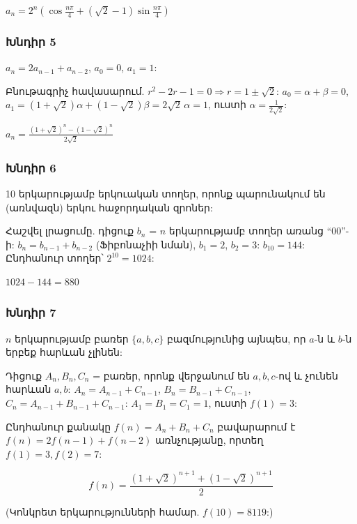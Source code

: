 $\boxed{a_n = 2^n\!\left(\cos\frac{n\pi}{4} + (\sqrt{2}-1)\sin\frac{n\pi}{4}\right)}$

\subsubsection*{Խնդիր 5}
$a_n=2a_{n-1}+a_{n-2}$, $a_0=0$, $a_1=1$:

Բնութագրիչ հավասարում. $r^2-2r-1=0 \Rightarrow r=1\pm\sqrt{2}$:
$a_0=\alpha+\beta=0$, $a_1=(1+\sqrt{2})\alpha+(1-\sqrt{2})\beta = 2\sqrt{2}\,\alpha=1$, ուստի $\alpha=\frac{1}{2\sqrt{2}}$:

$\boxed{a_n = \frac{(1+\sqrt{2})^n - (1-\sqrt{2})^n}{2\sqrt{2}}}$

\subsubsection*{Խնդիր 6}
10 երկարությամբ երկուական տողեր, որոնք պարունակում են (առնվազն) երկու հաջորդական զրոներ:

Հաշվել լրացումը. դիցուք $b_n$ = $n$ երկարությամբ տողեր առանց ``00''-ի:
$b_n = b_{n-1}+b_{n-2}$ (Ֆիբոնաչիի նման), $b_1=2$, $b_2=3$:
$b_{10}=144$: Ընդհանուր տողեր՝ $2^{10}=1024$:

$\boxed{1024-144=880}$

\subsubsection*{Խնդիր 7}
$n$ երկարությամբ բառեր $\{a,b,c\}$ բազմությունից այնպես, որ $a$-ն և $b$-ն երբեք հարևան չլինեն:

Դիցուք $A_n, B_n, C_n$ = բառեր, որոնք վերջանում են $a, b, c$-ով և չունեն հարևան $a,b$:
$A_n = A_{n-1}+C_{n-1}$, $B_n = B_{n-1}+C_{n-1}$, $C_n = A_{n-1}+B_{n-1}+C_{n-1}$:
$A_1=B_1=C_1=1$, ուստի $f(1)=3$:

Ընդհանուր քանակը $f(n) = A_n+B_n+C_n$ բավարարում է $f(n)=2f(n-1)+f(n-2)$ առնչությանը, որտեղ $f(1)=3, f(2)=7$:

\[
\boxed{f(n) = \frac{(1+\sqrt{2})^{n+1} + (1-\sqrt{2})^{n+1}}{2}}
\]

(Կոնկրետ երկարությունների համար. $f(10)=8119$:)